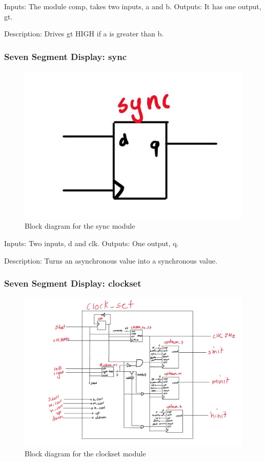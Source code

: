 \documentclass[a4paper]{article}
\begin{document}
Inputs: The module comp, takes two inputs, a and b.
Outputs: It has one output, gt.

Description: Drives gt HIGH if a is greater than b.

\subsubsection{Seven Segment Display: sync}
\begin{figure}[H]
    \includegraphics[width=0.8 \linewidth]{images/sync.JPG}
    \caption{Block diagram for the sync module}
    \label{sync}
\end{figure}

Inputs: Two inputs, d and clk.
Outputs: One output, q.

Description: Turns an asynchronous value into a synchronous value.

\subsubsection{Seven Segment Display: clockset}
\begin{figure}[H]
    \includegraphics[width=0.8 \linewidth]{images/clockset.JPG}
    \caption{Block diagram for the clockset module}
    \label{clockset}
\end{figure}
\end{document}
